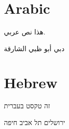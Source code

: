 \documentclass[a4paper]{article}
\begin{document}
\section{Arabic}
\begin{Arabic}%

هذا نص عربي.

دبي
أبو ظبي
الشارقة

\end{Arabic}

\section{Hebrew}
\begin{hebrew}



זה טקסט בעברית

ירושלים
תל אביב
חיפה

\end{hebrew}


\printindex
\end{document}
